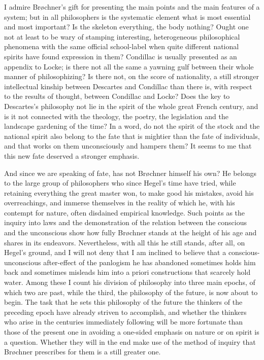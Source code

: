 \documentclass[12pt,a4paper,openany]{book}
\newcommand{\opage}[1]{\marginnote{\footnotesize\textit{[#1]}}}
\begin{document}
I admire Brøchner's gift for presenting the main points and the
main features of a system; but in all philosophers is
\opage{121}the systematic element what is most essential and most important?
Is the skeleton everything, the body nothing? Ought one not at
least to be wary of stamping interesting, heterogeneous
philosophical phenomena with the same official school-label when
quite different national spirits have found expression in them?
Condillac is usually presented as an appendix to Locke; is there
not all the same a yawning gulf between their whole manner of
philosophizing? Is there not, on the score of nationality, a
still stronger intellectual kinship between Descartes and Condillac
than there is, with respect to the results of thought, between
Condillac and Locke? Does the key to Descartes's philosophy not
lie in the spirit of the whole great French century, and is it
not connected with the theology, the poetry, the legislation and
the landscape gardening of the time? In a word, do not the spirit
of the stock and the national spirit also belong to the fate that
is mightier than the fate of individuals, and that works on them
unconsciously and hampers them? It seems to me that this new fate
deserved a stronger emphasis.

And since we are speaking of fate, has not Brøchner himself his
own? He belongs to the large group of philosophers who since
Hegel's time have tried, while retaining everything the great
master won, to make good his mistakes, avoid his overreachings,
and immerse themselves in the reality of which he, with his
contempt for nature, often disdained empirical knowledge. Such
points as the inquiry into laws and the demonstration of the
relation between the conscious and the unconscious show how fully
Brøchner stands at the height of his age and shares in its
endeavors. Nevertheless, with all this he still stands, after all,
on Hegel's ground, and I will not deny that I am inclined to %
believe that a conscious-unconscious after-effect of the %
panlogism he has abandoned sometimes holds him back and sometimes
misleads him into a priori constructions that scarcely hold water.
Among these I count his division of philosophy into three main
epochs, of which two are past, while the third, the philosophy of
the future, is now about to begin. The task that he sets this
philosophy of the future the thinkers of the preceding epoch have
already striven to accomplish, and whether the thinkers who arise
in the centuries immediately following will be more fortunate than
those of the present one in avoiding a one-sided emphasis on
nature or on spirit is a
\opage{122}question. Whether they will in the end make use of the method
of inquiry that Brøchner prescribes for them is a still greater
one.
\end{document}
